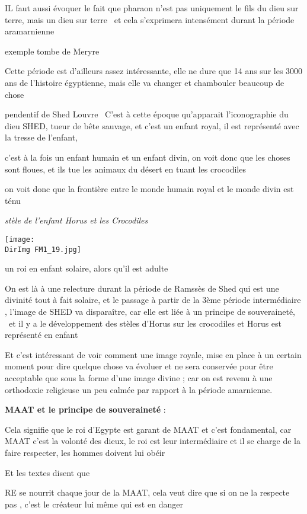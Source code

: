 \documentclass[a4paper]{article}
\newcommand{\DirImg}{../img/FaivreMartin/}
\begin{document}
IL faut aussi évoquer le fait que pharaon n'est pas uniquement le fils du dieu sur terre, mais un dieu sur terre \ et
cela s'exprimera intensément durant la période aramarnienne

exemple tombe de Meryre

Cette période est d'ailleurs assez intéressante, elle ne dure que 14 ans sur les 3000 ans de l'histoire égyptienne, mais
elle va changer et chambouler beaucoup de chose


pendentif de Shed Louvre \ C'est à cette époque qu'apparait l'iconographie du dieu SHED, tueur de bête sauvage, et c'est
un enfant royal, il est représenté avec la tresse de l'enfant, 

c'est à la fois un enfant humain et un enfant divin, on voit donc que les choses sont floues, et ils tue les animaux du
désert en tuant les crocodiles

on voit donc que la frontière entre le monde humain royal et le monde divin est ténu


\textit{stèle de l'enfant Horus et les Crocodiles}


\texttt{[image: \\DirImg FM1\_19.jpg]} 


un roi en enfant solaire, alors qu'il est adulte

On est là à une relecture durant la période de Ramssès de Shed qui est une divinité tout à fait solaire, et le passage à
partir de la 3ème période intermédiaire , l'image de SHED va disparaître, car elle est liée à un principe de
souveraineté, \ et il y a le développement des stèles d'Horus sur les crocodiles et Horus est représenté en enfant

Et c'est intéressant de voir comment une image royale, mise en place à un certain moment pour dire quelque chose va
évoluer et ne sera conservée pour être acceptable que sous la forme d'une image divine ; car on est revenu à une
orthodoxie religieuse un peu calmée par rapport à la période amarnienne.


\textbf{MAAT et le principe de souveraineté} :


Cela signifie que le roi d'Egypte est garant de MAAT et c'est fondamental, car MAAT c'est la volonté des dieux, le roi
est leur intermédiaire et il se charge de la faire respecter, les hommes doivent lui obéir

Et les textes disent que


RE se nourrit chaque jour de la MAAT, cela veut dire que si on ne la respecte pas , c'est le créateur lui même qui est
en danger
\end{document}
